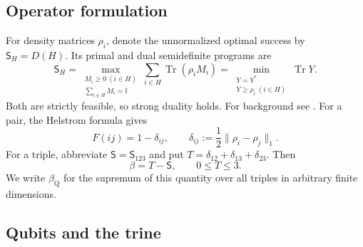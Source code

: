 \documentclass[10pt,a4paper]{amsart}
\newcommand{\Tr}{\operatorname{Tr}}
\newcommand{\id}{\mathbb I}
\newcommand{\1}{\mathbf 1}
\newcommand{\Sopt}{\mathsf S}
\begin{document}
\subsection{Operator formulation}

For density matrices $\rho_i$, denote the unnormalized optimal success by
$\Sopt_H=D(H)$. Its primal and dual semidefinite programs are
\begin{equation}\label{eq:quantum-SDP}
 \Sopt_H
 =\max_{\substack{M_i\ge0\ (i\in H)\\\sum_{i\in H}M_i=\id}}
       \sum_{i\in H}\Tr(\rho_iM_i)
 =\min_{\substack{Y=Y^*\\Y\ge\rho_i\ (i\in H)}}\Tr Y.
\end{equation}
Both are strictly feasible, so strong duality holds. For background see
\cite{Helstrom1976,BaeKwek2015}. For a pair, the Helstrom formula gives
\begin{equation}\label{eq:Helstrom}
 F(ij)=1-\delta_{ij},\qquad
 \delta_{ij}:=\frac12\|\rho_i-\rho_j\|_1.
\end{equation}
For a triple, abbreviate $\Sopt=\Sopt_{123}$ and put
$T=\delta_{12}+\delta_{13}+\delta_{23}$. Then
\begin{equation}\label{eq:beta-operator}
 \beta=T-\Sopt,\qquad 0\le T\le3.
\end{equation}
We write $\beta_{\mathrm Q}$ for the supremum of this quantity over all triples
in arbitrary finite dimensions.

\subsection{Qubits and the trine}
\end{document}
